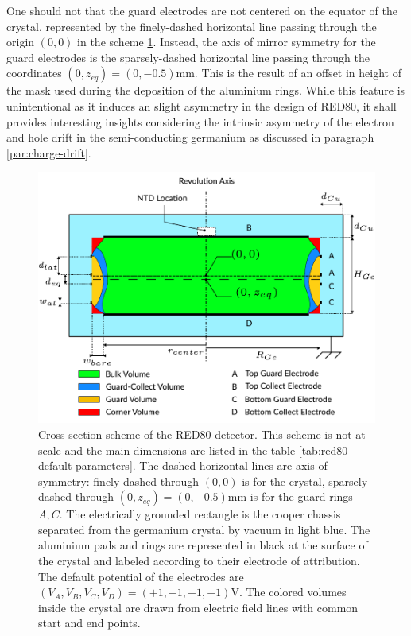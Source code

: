 One should not that the guard electrodes are not centered on the equator of the crystal, represented by the finely-dashed horizontal line passing through the origin $(0,0)$ in the scheme \ref{fig:red80-scheme}. Instead, the axis of mirror symmetry for the guard electrodes is the sparsely-dashed  horizontal line passing through the coordinates $(0, z_{eq})=(0, -0.5)\si{\mm}$. This is the result of an offset in height of the mask used during the deposition of the aluminium rings. While this feature is unintentional as it induces an slight asymmetry in the design of RED80, it shall provides interesting insights considering the intrinsic asymmetry of the electron and hole drift in the semi-conducting germanium as discussed in paragraph \ref{par:charge-drift}.

\begin{figure}
\centering
\includegraphics[scale=1]{Figures/ElectrodesExperimental/scheme_red80.pdf}
\caption{Cross-section scheme of the RED80 detector. This scheme is not at scale and the main dimensions are listed in the table \ref{tab:red80-default-parameters}. The dashed horizontal lines are axis of symmetry: finely-dashed through $(0,0)$ is for the crystal, sparsely-dashed through $(0, z_{eq})=(0, -0.5)\si{\mm}$  is for the guard rings $A,C$. The electrically grounded rectangle is the cooper chassis separated from the germanium crystal by vacuum in light blue. The aluminium pads and rings are represented in black at the surface of the crystal and labeled according to their electrode of attribution. The default potential of the electrodes are $(V_A, V_B, V_C, V_D) = (+1, +1, -1, -1) \si{\volt}$. The colored volumes inside the crystal are drawn from electric field lines with common start and end points.}
\label{fig:red80-scheme}
\end{figure}

